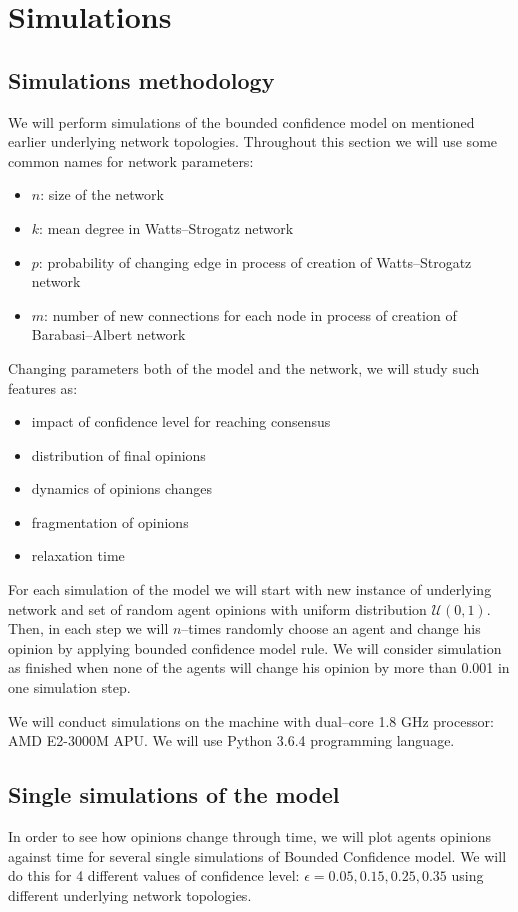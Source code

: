 \documentclass{article}
\begin{document}
\section{Simulations}

\subsection{Simulations methodology}

We will perform simulations of the bounded confidence model on mentioned earlier underlying network topologies. Throughout this section we will use some common names for network parameters:
\begin{itemize}
\item $n$: size of the network
\item $k$: mean degree in Watts--Strogatz network
\item $p$: probability of changing edge in process of creation of Watts--Strogatz network
\item $m$: number of new connections for each node in process of creation of Barabasi--Albert network
\end{itemize}
Changing parameters both of the model and the network, we will study such features as:
\begin{itemize}
\item impact of confidence level for reaching consensus
\item distribution of final opinions
\item dynamics of opinions changes
\item fragmentation of opinions
\item relaxation time
\end{itemize}

For each simulation of the model we will start with new instance of underlying network and set of random agent opinions with uniform distribution $\mathcal{U}(0, 1)$. Then, in each step we will $n$--times randomly choose an agent and change his opinion by applying bounded confidence model rule. We will consider simulation as finished when none of the agents will change his opinion by more than 0.001 in one simulation step. 
\indent

We will conduct simulations on the machine with dual--core 1.8 GHz processor: AMD E2-3000M APU. We will use Python 3.6.4 programming language.

\subsection{Single simulations of the model}
In order to see how opinions change through time, we will plot agents opinions against time for several single simulations of Bounded Confidence model. We will do this for 4 different values of confidence level: $\epsilon=0.05, 0.15, 0.25, 0.35$ using different underlying network topologies.
\end{document}
